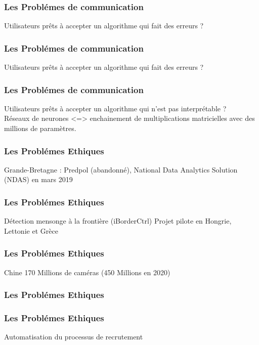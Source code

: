 \documentclass{formation}
\begin{document}
\begin{frame}
  \frametitle{Les Problémes de communication}
  Utilisateurs prêts à accepter un algorithme qui fait des erreurs ?
\end{frame}

\begin{frame}
  \frametitle{Les Problémes de communication}
  Utilisateurs prêts à accepter un algorithme qui fait des erreurs ?
\end{frame}

\begin{frame}
  \frametitle{Les Problémes de communication}
  Utilisateurs prêts à accepter un algorithme qui n'est pas interprétable ?\\
  Réseaux de neurones <=> enchainement de multiplications matricielles avec des millions de paramètres.
\end{frame}

\begin{frame}
  \frametitle{Les Problémes Ethiques}
  Grande-Bretagne : Predpol (abandonné),  National Data Analytics Solution (NDAS) en mars 2019
\end{frame}

\begin{frame}
  \frametitle{Les Problémes Ethiques}
  Détection mensonge à la frontière (iBorderCtrl)
  \newline
  Projet pilote en Hongrie, Lettonie et Grèce
\end{frame}

\begin{frame}
  \frametitle{Les Problémes Ethiques}
  Chine 170 Millions de caméras (450 Millions en 2020)
  \begin{minipage}[c]{0.49\linewidth}
  \end{minipage}\hfill
  \begin{minipage}[c]{0.49\linewidth}
  \end{minipage}\hfill
\end{frame}

\begin{frame}
  \frametitle{Les Problémes Ethiques}
\end{frame}

\begin{frame}
  \frametitle{Les Problémes Ethiques}
  Automatisation du processus de recrutement
\end{frame}
\end{document}

